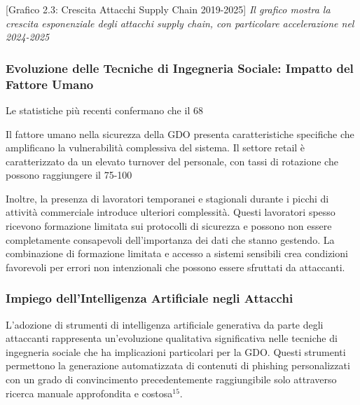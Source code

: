 {[Grafico 2.3: Crescita Attacchi Supply Chain 2019-2025]
\textit{Il grafico mostra la crescita esponenziale degli attacchi supply chain, con particolare accelerazione nel 2024-2025}

\subsubsection{Evoluzione delle Tecniche di Ingegneria Sociale: Impatto del Fattore Umano}

Le statistiche più recenti confermano che il 68%

Il fattore umano nella sicurezza della GDO presenta caratteristiche specifiche che amplificano la vulnerabilità complessiva del sistema. Il settore retail è caratterizzato da un elevato turnover del personale, con tassi di rotazione che possono raggiungere il 75-100%

Inoltre, la presenza di lavoratori temporanei e stagionali durante i picchi di attività commerciale introduce ulteriori complessità. Questi lavoratori spesso ricevono formazione limitata sui protocolli di sicurezza e possono non essere completamente consapevoli dell'importanza dei dati che stanno gestendo. La combinazione di formazione limitata e accesso a sistemi sensibili crea condizioni favorevoli per errori non intenzionali che possono essere sfruttati da attaccanti.

\subsubsection{Impiego dell'Intelligenza Artificiale negli Attacchi}

L'adozione di strumenti di intelligenza artificiale generativa da parte degli attaccanti rappresenta un'evoluzione qualitativa significativa nelle tecniche di ingegneria sociale che ha implicazioni particolari per la GDO. Questi strumenti permettono la generazione automatizzata di contenuti di phishing personalizzati con un grado di convincimento precedentemente raggiungibile solo attraverso ricerca manuale approfondita e costosa$^{15}$.

}
